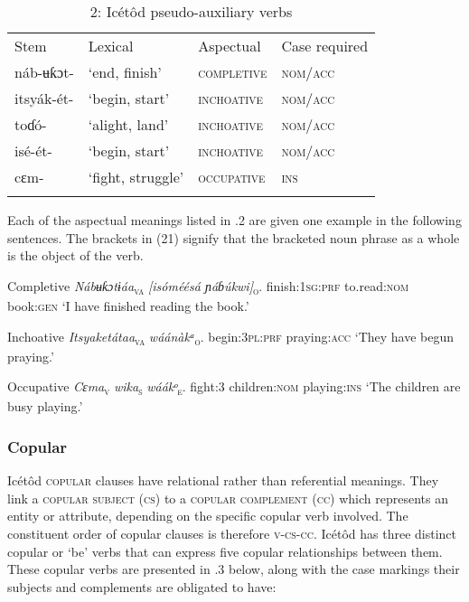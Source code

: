 \begin{table}
\begin{table}
\caption{2: Icétôd pseudo-auxiliary verbs}
\label{tab:10}


\begin{tabularx}{\textwidth}{XXXX}
\lsptoprule

Stem & Lexical & Aspectual & Case required\\
náb-ʉƙɔt- & ‘end, finish’ & \textsc{completive} & \textsc{nom/acc}\\
itsyák-ét- & ‘begin, start’ & \textsc{inchoative} & \textsc{nom/acc}\\
toɗó- & ‘alight, land’ & \textsc{inchoative} & \textsc{nom/acc}\\
isé-ét- & ‘begin, start’ & \textsc{inchoative} & \textsc{nom/acc}\\
cɛm- & ‘fight, struggle’ & \textsc{occupative} & \textsc{ins}\\
\lspbottomrule
\end{tabularx}
\end{table}
Each of the aspectual meanings listed in .2 are given one example in the following sentences. The brackets in (21) signify that the bracketed noun phrase as a whole is the object of the verb.



Completive
\textit{Nábʉƙɔtɨáa}\textsc{\textsubscript{va}}\textit{    [isóméésá   ɲáɓúkwi]}\textsc{\textsubscript{o}}.
finish:\textsc{1sg:prf}   to.read:\textsc{nom}   book:\textsc{gen}
‘I have finished reading the book.’




Inchoative
\textit{Itsyaketátaa}\textsc{\textsubscript{va}}\textit{  wáánàkᵃ}\textsc{\textsubscript{o}}.
begin:\textsc{3pl:prf}   praying:\textsc{acc}
‘They have begun praying.’




Occupative
\textit{Cɛma}\textsc{\textsubscript{v  }}\textit{  wika}\textsc{\textsubscript{s}}\textit{       wáákᵒ}\textsc{\textsubscript{e}}.
fight:3   children:\textsc{nom}   playing:\textsc{ins}
‘The children are busy playing.’




\subsubsection{Copular}

Icétôd \textsc{copular }clauses have relational rather than referential meanings. They link a \textsc{copular subject} (\textsc{cs}) to a \textsc{copular} \textsc{complement} (\textsc{cc}) which represents an entity or attribute, depending on the specific copular verb involved. The constituent order of copular clauses is therefore \textsc{v-cs-cc}. Icétôd has three distinct copular or ‘be’ verbs that can express five copular relationships between them. These copular verbs are presented in .3 below, along with the case markings their subjects and complements are obligated to have:



\end{table}
